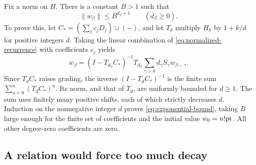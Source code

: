 Fix a norm on $H$. There is a constant $B>1$ such that
\begin{equation}\label{eq:exponential-bound}
 \|w_\beta\|\le B^{d_\beta+1}\qquad(d_\beta\ge0).
\end{equation}
To prove this, let $C_*=(\sum_jc_jD_j)\cup(-)$, and let $T_d$ multiply
$H_k$ by $1+k/d$ for positive integers $d$. Taking the linear
combination of \eqref{eq:normalized-recurrence} with coefficients $c_j$
yields
\[
 w_\beta=(I-T_{d_\beta}C_*)^{-1}T_{d_\beta}
              \sum_{\gamma>0}d_\gamma S_\gamma w_{\beta-\gamma}.
\]
Since $T_dC_*$ raises grading, the inverse $(I-T_dC_*)^{-1}$ is the
finite sum $\sum_{a=0}^n(T_dC_*)^a$. Its norm, and that of $T_d$, are uniformly
bounded for $d\ge1$. The sum uses finitely many positive shifts, each of
which strictly decreases $d$. Induction on the nonnegative integer $d$
proves \eqref{eq:exponential-bound}, taking $B$ large enough for the
finite set of coefficients and the initial value $w_0=n!\mathrm{pt}$.
All other degree-zero coefficients are zero.

\subsection{A relation would force too much decay}

